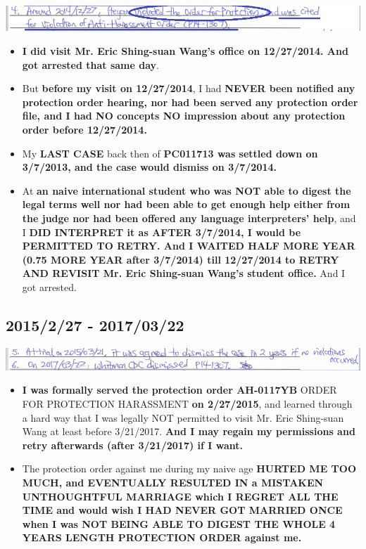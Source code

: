 \documentclass[9pt, b5paper]{article}
\begin{document}
\includegraphics[width=.9\linewidth]{./pic/dearCousin_20220920_153023.png}
\begin{itemize}
\item \textbf{I did visit Mr. Eric Shing-suan Wang's office on 12/27/2014. And got arrested that same day}.
\item But \textbf{before my visit on 12/27/2014}, I had \textbf{NEVER been notified any protection order hearing, nor had been served any protection order file, and I had NO concepts NO impression about any protection order before 12/27/2014.}
\item My \textbf{LAST CASE} back then of \textbf{PC011713 was settled down on 3/7/2013, and the case would dismiss on 3/7/2014.}
\item At \textbf{an naive international student who was NOT able to digest the legal terms well nor had been able to get enough help either from the judge nor had been offered any language interpreters' help}, and I \textbf{DID INTERPRET it as AFTER 3/7/2014, I would be PERMITTED TO RETRY. And I WAITED HALF MORE YEAR (0.75 MORE YEAR after 3/7/2014) till 12/27/2014 to RETRY AND REVISIT Mr. Eric Shing-suan Wang's student office.} And I got arrested.
\end{itemize}
\subsection{2015/2/27 - 2017/03/22}
\label{sec-5-5}

\includegraphics[width=.9\linewidth]{./pic/dearCousin_20220920_153227.png}
\begin{itemize}
\item \textbf{I was formally served the protection order AH-0117YB} ORDER FOR PROTECTION HARASSMENT \textbf{on 2/27/2015}, and learned through a hard way that I was legally NOT permitted to visit Mr. Eric Shing-suan Wang at least before 3/21/2017. \textbf{And I may regain my permissions and retry afterwards (after 3/21/2017) if I want.}
\item The protection order against me during my naive age \textbf{HURTED ME TOO MUCH, and EVENTUALLY RESULTED IN a MISTAKEN UNTHOUGHTFUL MARRIAGE which I REGRET ALL THE TIME and would wish I HAD NEVER GOT MARRIED ONCE when I was NOT BEING ABLE TO DIGEST THE WHOLE 4 YEARS LENGTH PROTECTION ORDER against me.}
\end{itemize}
\end{document}
